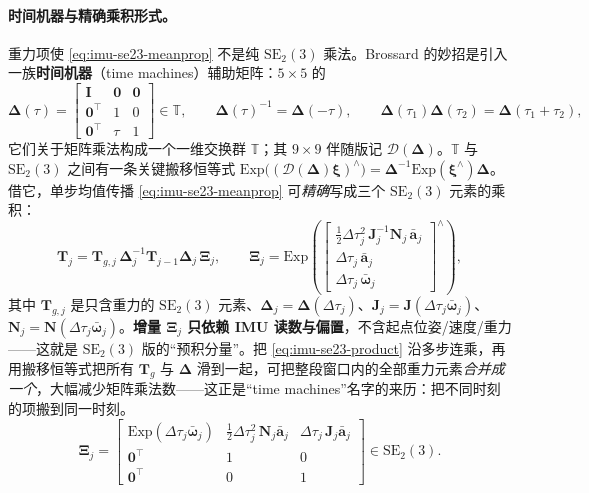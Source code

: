 \paragraph{时间机器与精确乘积形式。}
重力项使 \cref{eq:imu-se23-meanprop} 不是纯 $\mathrm{SE}_2(3)$ 乘法。Brossard 的妙招是引入一族\textbf{时间机器}（time machines）辅助矩阵：$5\times5$ 的
\begin{equation}
  \boldsymbol\Delta(\tau)=\begin{bmatrix}\mathbf I&\mathbf 0&\mathbf 0\\\mathbf 0^\top&1&0\\\mathbf 0^\top&\tau&1\end{bmatrix}\in\mathbb T,
  \qquad
  \boldsymbol\Delta(\tau)^{-1}=\boldsymbol\Delta(-\tau),
  \qquad
  \boldsymbol\Delta(\tau_1)\boldsymbol\Delta(\tau_2)=\boldsymbol\Delta(\tau_1+\tau_2),
  \label{eq:imu-timemachine}
\end{equation}
它们关于矩阵乘法构成一个一维交换群 $\mathbb T$；其 $9\times9$ 伴随版记 $\mathcal D(\boldsymbol\Delta)$。$\mathbb T$ 与 $\mathrm{SE}_2(3)$ 之间有一条关键搬移恒等式 $\mathrm{Exp}\!\big((\mathcal D(\boldsymbol\Delta)\boldsymbol\xi)^\wedge\big)=\boldsymbol\Delta^{-1}\mathrm{Exp}(\boldsymbol\xi^\wedge)\boldsymbol\Delta$。借它，单步均值传播 \cref{eq:imu-se23-meanprop} 可\emph{精确}写成三个 $\mathrm{SE}_2(3)$ 元素的乘积\cite{brossard2021associating,barfoot2024state}：
\begin{equation}
  \mathbf T_j=\mathbf T_{g,j}\,\boldsymbol\Delta_j^{-1}\mathbf T_{j-1}\boldsymbol\Delta_j\,\boldsymbol\Xi_j,
  \qquad
  \boldsymbol\Xi_j=\mathrm{Exp}\!\left(\begin{bmatrix}\tfrac12\Delta\tau_j^2\,\mathbf J_j^{-1}\mathbf N_j\,\bar{\mathbf a}_j\\[1pt]\Delta\tau_j\,\bar{\mathbf a}_j\\[1pt]\Delta\tau_j\,\bar{\boldsymbol\omega}_j\end{bmatrix}^{\!\wedge}\right),
  \label{eq:imu-se23-product}
\end{equation}
其中 $\mathbf T_{g,j}$ 是只含重力的 $\mathrm{SE}_2(3)$ 元素、$\boldsymbol\Delta_j=\boldsymbol\Delta(\Delta\tau_j)$、$\mathbf J_j=\mathbf J(\Delta\tau_j\bar{\boldsymbol\omega}_j)$、$\mathbf N_j=\mathbf N(\Delta\tau_j\bar{\boldsymbol\omega}_j)$。\textbf{增量 $\boldsymbol\Xi_j$ 只依赖 IMU 读数与偏置}，不含起点位姿/速度/重力——这就是 $\mathrm{SE}_2(3)$ 版的“预积分量”。把 \cref{eq:imu-se23-product} 沿多步连乘，再用搬移恒等式把所有 $\mathbf T_{g}$ 与 $\boldsymbol\Delta$ 滑到一起，可把整段窗口内的全部重力元素\emph{合并成一个}，大幅减少矩阵乘法数——这正是“time machines”名字的来历：把不同时刻的项搬到同一时刻。
\begin{equation}
  \boldsymbol\Xi_j=\begin{bmatrix}\mathrm{Exp}(\Delta\tau_j\bar{\boldsymbol\omega}_j)&\tfrac12\Delta\tau_j^2\,\mathbf N_j\bar{\mathbf a}_j&\Delta\tau_j\,\mathbf J_j\bar{\mathbf a}_j\\\mathbf 0^\top&1&0\\\mathbf 0^\top&0&1\end{bmatrix}\in\mathrm{SE}_2(3).
  \label{eq:imu-Xi}
\end{equation}

